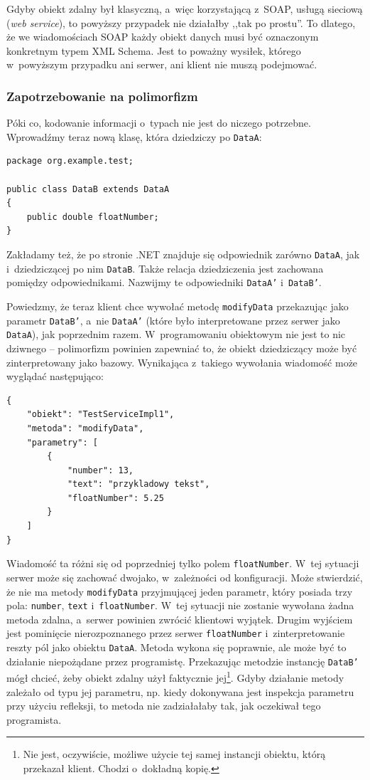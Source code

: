 Gdyby obiekt zdalny był klasyczną, a~więc korzystającą z~SOAP, usługą sieciową (\emph{web service}), to powyższy przypadek nie działałby ,,tak po prostu''.
To dlatego, że we wiadomościach SOAP każdy obiekt danych musi być oznaczonym konkretnym typem XML Schema.
Jest to poważny wysiłek, którego w~powyższym przypadku ani serwer, ani klient nie muszą podejmować.

\subsubsection{Zapotrzebowanie na polimorfizm}
\label{need-for-polymorphism}
Póki co, kodowanie informacji o~typach nie jest do niczego potrzebne. Wprowadźmy teraz nową klasę, która dziedziczy po \texttt{DataA}:
\begin{lstlisting}[frame=single]
package org.example.test;

public class DataB extends DataA
{
    public double floatNumber;
}
\end{lstlisting}
Zakładamy też, że po stronie .NET znajduje się odpowiednik zarówno \texttt{DataA}, jak i~dziedziczącej po nim \texttt{DataB}. Także relacja dziedziczenia jest zachowana pomiędzy odpowiednikami. Nazwijmy te odpowiedniki \texttt{DataA'} i~\texttt{DataB'}.

Powiedzmy, że teraz klient chce wywołać metodę \texttt{modifyData} przekazując jako parametr \texttt{DataB'}, a~nie \texttt{DataA'} (które było interpretowane przez serwer jako \texttt{DataA}), jak poprzednim razem.
W~programowaniu obiektowym nie jest to nic dziwnego -- polimorfizm powinien zapewniać to, że obiekt dziedziczący może być zinterpretowany jako bazowy.
Wynikająca z~takiego wywołania wiadomość może wyglądać następująco:
\begin{lstlisting}[frame=single]
{
    "obiekt": "TestServiceImpl1",
    "metoda": "modifyData",
    "parametry": [
        {
            "number": 13,
            "text": "przykladowy tekst",
            "floatNumber": 5.25
        }
    ]
}
\end{lstlisting}

Wiadomość ta różni się od poprzedniej tylko polem \texttt{floatNumber}. W~tej sytuacji serwer może się zachować dwojako, w~zależności od konfiguracji.
Może stwierdzić, że nie ma metody \texttt{modifyData} przyjmującej jeden parametr, który posiada trzy pola: \texttt{number}, \texttt{text} i~\texttt{floatNumber}. W~tej sytuacji nie zostanie wywołana żadna metoda zdalna, a~serwer powinien zwrócić klientowi wyjątek.
Drugim wyjściem jest pominięcie nierozpoznanego przez serwer \texttt{floatNumber} i~zinterpretowanie reszty pól jako obiektu \texttt{DataA}.
Metoda wykona się poprawnie, ale może być to działanie niepożądane przez programistę. Przekazując metodzie instancję \texttt{DataB'} mógł chcieć, żeby obiekt zdalny użył faktycznie jej\footnote{Nie jest, oczywiście, możliwe użycie tej samej instancji obiektu, którą przekazał klient. Chodzi o~dokładną kopię.}. Gdyby działanie metody zależało od typu jej parametru, np. kiedy dokonywana jest inspekcja parametru przy użyciu refleksji, to metoda nie zadziałałaby tak, jak oczekiwał tego programista.

